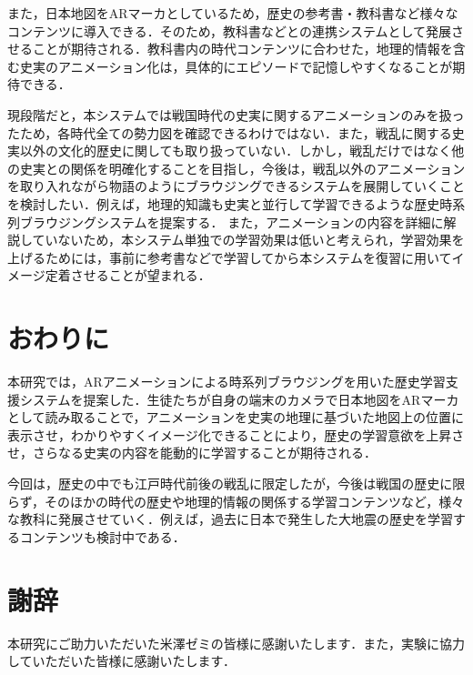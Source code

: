 \documentclass[a4paper,dvipdfmx]{hisken}
\begin{document}
また，日本地図をARマーカとしているため，歴史の参考書・教科書など様々なコンテンツに導入できる．そのため，教科書などとの連携システムとして発展させることが期待される．教科書内の時代コンテンツに合わせた，地理的情報を含む史実のアニメーション化は，具体的にエピソードで記憶しやすくなることが期待できる．

現段階だと，本システムでは戦国時代の史実に関するアニメーションのみを扱ったため，各時代全ての勢力図を確認できるわけではない．また，戦乱に関する史実以外の文化的歴史に関しても取り扱っていない．しかし，戦乱だけではなく他の史実との関係を明確化することを目指し，今後は，戦乱以外のアニメーションを取り入れながら物語のようにブラウジングできるシステムを展開していくことを検討したい．例えば，地理的知識も史実と並行して学習できるような歴史時系列ブラウジングシステムを提案する．
また，アニメーションの内容を詳細に解説していないため，本システム単独での学習効果は低いと考えられ，学習効果を上げるためには，事前に参考書などで学習してから本システムを復習に用いてイメージ定着させることが望まれる．


\section{おわりに}

本研究では，ARアニメーションによる時系列ブラウジングを用いた歴史学習支援システムを提案した．生徒たちが自身の端末のカメラで日本地図をARマーカとして読み取ることで，アニメーションを史実の地理に基づいた地図上の位置に表示させ，わかりやすくイメージ化できることにより，歴史の学習意欲を上昇させ，さらなる史実の内容を能動的に学習することが期待される．

今回は，歴史の中でも江戸時代前後の戦乱に限定したが，今後は戦国の歴史に限らず，そのほかの時代の歴史や地理的情報の関係する学習コンテンツなど，様々な教科に発展させていく．例えば，過去に日本で発生した大地震の歴史を学習するコンテンツも検討中である．


\section*{謝辞}
本研究にご助力いただいた米澤ゼミの皆様に感謝いたします．また，実験に協力していただいた皆様に感謝いたします．





\end{document}
